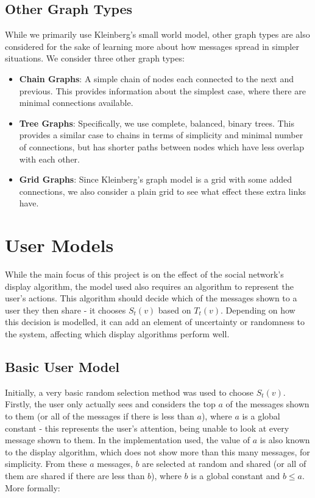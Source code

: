 \documentclass[bsc,frontabs,twoside,singlespacing,parskip,deptreport]{infthesis}     %
\begin{document}
\subsection{Other Graph Types}

While we primarily use Kleinberg's small world model, other graph types are also considered for the sake of learning more about how messages spread in simpler situations. We consider three other graph types:

\begin{itemize}
\item \textbf{Chain Graphs}: A simple chain of nodes each connected to the next and previous. This provides information about the simplest case, where there are minimal connections available.
\item \textbf{Tree Graphs}: Specifically, we use complete, balanced, binary trees. This provides a similar case to chains in terms of simplicity and minimal number of connections, but has shorter paths between nodes which have less overlap with each other.
\item \textbf{Grid Graphs}: Since Kleinberg's graph model is a grid with some added connections, we also consider a plain grid to see what effect these extra links have.
\end{itemize}

\section{User Models} \label{sec:user_models}
While the main focus of this project is on the effect of the social network's display algorithm, the model used also requires an algorithm to represent the user's actions. This algorithm should decide which of the messages shown to a user they then share - it chooses $S_{t}(v)$ based on $T_{t}(v)$. Depending on how this decision is modelled, it can add an element of uncertainty or randomness to the system, affecting which display algorithms perform well.

\subsection{Basic User Model}
Initially, a very basic random selection method was used to choose $S_{t}(v)$. Firstly, the user only actually sees and considers the top $a$ of the messages shown to them (or all of the messages if there is less than $a$), where $a$ is a global constant - this represents the user's attention, being unable to look at every message shown to them. In the implementation used, the value of $a$ is also known to the display algorithm, which does not show more than this many messages, for simplicity. From these $a$ messages, $b$ are selected at random and shared (or all of them are shared if there are less than $b$), where $b$ is a global constant and $b \le a$. More formally:
\end{document}
